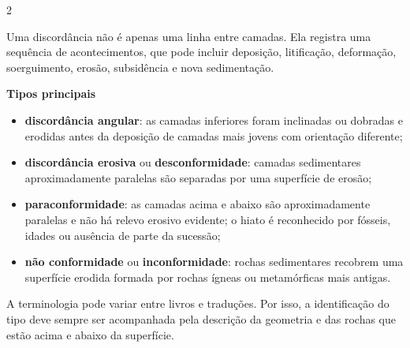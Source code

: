 \documentclass[11pt,a4paper,twoside,openany]{book}
\newenvironment{verbete}[1]{%
  \needspace{6\baselineskip}
  \markboth{#1}{#1}
  \par\addvspace{0.55em}
  \noindent{\sffamily\bfseries\large\color{uerjblue}#1}\par\nobreak
  \vspace{0.15em}
}{%
  \par\addvspace{0.65em}
}
\newcommand{\termo}[1]{\textbf{#1}}
\begin{document}
\begin{multicols*}{2}
\begin{verbete}{Discordâncias}
Uma discordância não é apenas uma linha entre camadas. Ela registra uma sequência de acontecimentos, que pode incluir deposição, litificação, deformação, soerguimento, erosão, subsidência e nova sedimentação.

\textbf{Tipos principais}

\begin{itemize}
  \item \termo{discordância angular}: as camadas inferiores foram inclinadas ou dobradas e erodidas antes da deposição de camadas mais jovens com orientação diferente;
  \item \termo{discordância erosiva} ou \termo{desconformidade}: camadas sedimentares aproximadamente paralelas são separadas por uma superfície de erosão;
  \item \termo{paraconformidade}: as camadas acima e abaixo são aproximadamente paralelas e não há relevo erosivo evidente; o hiato é reconhecido por fósseis, idades ou ausência de parte da sucessão;
  \item \termo{não conformidade} ou \termo{inconformidade}: rochas sedimentares recobrem uma superfície erodida formada por rochas ígneas ou metamórficas mais antigas.
\end{itemize}

A terminologia pode variar entre livros e traduções. Por isso, a identificação do tipo deve sempre ser acompanhada pela descrição da geometria e das rochas que estão acima e abaixo da superfície.

\begin{center}
\end{center}
\end{verbete}
\end{multicols*}
\end{document}

